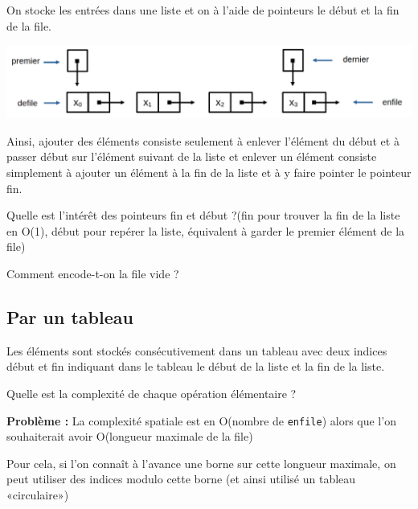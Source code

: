 \begin{idee}
	On stocke les entrées dans une liste et on à l'aide de pointeurs le début et la fin de la file.
\end{idee}

\begin{center}
	\includegraphics[width=0.8\linewidth ]{lecon/05-piles_files/liste_chainee.png}
\end{center}

\begin{impl}
	Ainsi, ajouter des éléments consiste seulement à enlever l'élément du début et à passer début sur l'élément suivant de la liste et enlever un élément consiste simplement à ajouter un élément à la fin de la liste et à y faire pointer le pointeur fin.
\end{impl}

\begin{exercise}
	Quelle est l'intérêt des pointeurs fin et début ?(fin pour trouver la fin de la liste en O(1), début pour repérer la liste, équivalent à garder le premier élément de la file)
\end{exercise}

\begin{exercise}
	Comment encode-t-on la file vide ?
\end{exercise}


\subsection{Par un tableau}

\begin{idee}
	Les éléments sont stockés consécutivement dans un tableau avec deux indices début et fin indiquant dans le tableau le début de la liste et la fin de la liste.
\end{idee}

\begin{exercise}
	Quelle est la complexité de chaque opération élémentaire ?
\end{exercise}

\textbf{Problème :} La complexité spatiale est en O(nombre de \texttt{enfile}) alors que l'on souhaiterait avoir O(longueur maximale de la file)

\begin{idee}
	Pour cela, si l'on connaît à l'avance une borne sur cette longueur maximale, on peut utiliser des indices modulo cette borne (et ainsi utilisé un tableau «circulaire»)
\end{idee}

